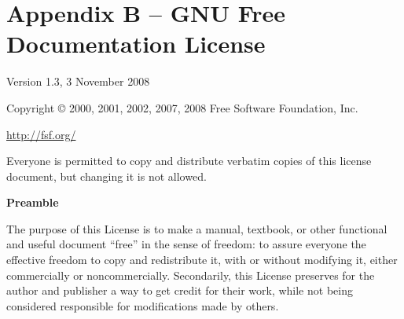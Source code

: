 \chapter{Appendix B -- GNU Free Documentation License} \label{Appendix B}
\fi

\ifdefined\chs

\fi

\ifdefined\eng
{}  %
\fi

\ifdefined\chs

\fi

\ifdefined\eng
 \begin{center}
\fi

\ifdefined\chs

\fi

\ifdefined\eng
       Version 1.3, 3 November 2008
\fi

\ifdefined\chs

\fi

\ifdefined\eng
\fi

\ifdefined\chs

\fi

\ifdefined\eng
 Copyright \copyright{} 2000, 2001, 2002, 2007, 2008  Free Software Foundation, Inc.
 
 \bigskip
 
     \url{http://fsf.org/}
  
 \bigskip
 
 Everyone is permitted to copy and distribute verbatim copies
 of this license document, but changing it is not allowed.
\end{center}
\fi

\ifdefined\chs

\fi

\ifdefined\eng
\fi

\ifdefined\chs

\fi

\ifdefined\eng
\begin{center}
{\bf\large Preamble}
\end{center}
\fi

\ifdefined\chs

\fi

\ifdefined\eng
The purpose of this License is to make a manual, textbook, or other
functional and useful document ``free'' in the sense of freedom: to
assure everyone the effective freedom to copy and redistribute it,
with or without modifying it, either commercially or noncommercially.
Secondarily, this License preserves for the author and publisher a way
to get credit for their work, while not being considered responsible
for modifications made by others.
\fi


